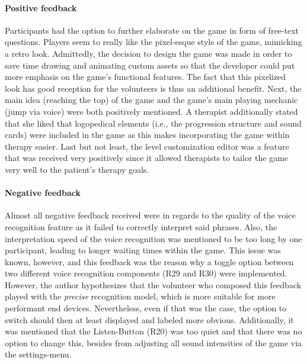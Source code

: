 \documentclass[draft,final]{vutinfth} %
\begin{document}
\paragraph{Positive feedback} Participants had the option to further elaborate on the game in form of free-text questions.  Players seem to really like the pixel-esque style of the game, mimicking a retro look. Admittedly, the decision to design the game was made in order to save time drawing and animating custom assets so that the developer could put more emphasis on the game's functional features. The fact that this pixelized look has good reception for the volunteers is thus an additional benefit. Next, the main idea (reaching the top) of the game and the game's main playing mechanic (jump via voice) were both positively mentioned. A therapist additionally stated that she liked that logopedical elements (i.e., the progression structure and sound cards) were included in the game as this makes incorporating the game within therapy easier. Last but not least, the level customization editor was a feature that was received very positively since it allowed therapists to tailor the game very well to the patient's therapy goals.

\paragraph{Negative feedback} Almost all negative feedback received were in regards to the quality of the voice recognition feature as it failed to correctly interpret said phrases. Also, the interpretation speed of the voice recognition was mentioned to be too long by one participant, leading to longer waiting times within the game. This issue was known, however, and this feedback was the reason why a toggle option between two different voice recognition components (R29 and R30) were implemented. However, the author hypothesizes that the volunteer who composed this feedback played with the \emph{precise} recognition model, which is more suitable for more performant end devices. Nevertheless, even if that was the case, the option to switch should then at least displayed and labeled more obvious. Additionally, it was mentioned that the Listen-Button (R20) was too quiet and that there was no option to change this, besides from adjusting all sound intensities of the game via the settings-menu.
\end{document}
